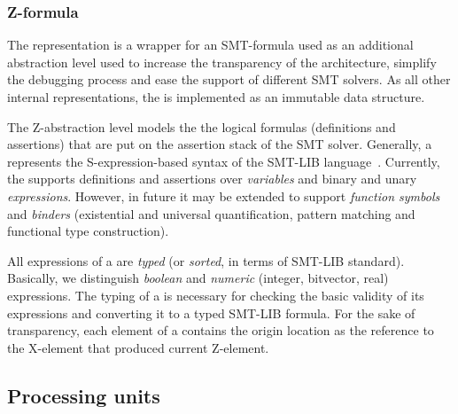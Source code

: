 



\subsubsection{Z-formula}
\label{ch:impl:model:zformula}


The \textit{\zformula{}} representation is a wrapper for an SMT-formula used as an additional abstraction level used to increase the transparency of the architecture, simplify the debugging process and ease the support of different SMT solvers.
As all other internal representations, the \zformula{} is implemented as an immutable data structure.

The Z-abstraction level models the the logical formulas (definitions and assertions) that are put on the assertion stack of the SMT solver.
Generally, a \zformula{} represents the S-expression-based syntax of the SMT-LIB language~\cite{smt-lib}. %
Currently, the \zformula{} supports definitions and assertions over \textit{variables} and binary and unary \textit{expressions}.
However, in future it may be extended to support \textit{function symbols} and \textit{binders} (existential and universal quantification, pattern matching and functional type construction).

All expressions of a \zformula{} are \textit{typed} (or \textit{sorted}, in terms of SMT-LIB standard).
Basically, we distinguish \textit{boolean} and \textit{numeric} (integer, bitvector, real) expressions.
The typing of a \zformula{} is necessary for checking the basic validity of its expressions and converting it to a typed SMT-LIB formula.
For the sake of transparency, each element of a \zformula{} contains the origin location as the reference to the X-element that produced current Z-element. %



\subsection{Processing units} %
\label{ch:impl:proc}


